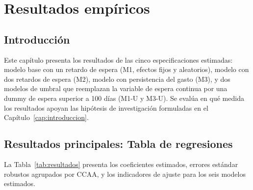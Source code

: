 \chapter{Resultados empíricos}
\label{cap:resultados}

\section{Introducción}

Este capítulo presenta los resultados de las cinco especificaciones estimadas:
modelo base con un retardo de espera (M1, efectos fijos y aleatorios), modelo
con dos retardos de espera (M2), modelo con persistencia del gasto (M3), y dos
modelos de umbral que reemplazan la variable de espera continua por una dummy
de espera superior a 100 días (M1-U y M3-U). Se evalúa en qué medida los
resultados apoyan las hipótesis de investigación formuladas en el
Capítulo~\ref{cap:introduccion}.

\section{Resultados principales: Tabla de regresiones}

La Tabla~\ref{tab:resultados} presenta los coeficientes estimados, errores
estándar robustos agrupados por CCAA, y los indicadores de ajuste para los
seis modelos estimados.


